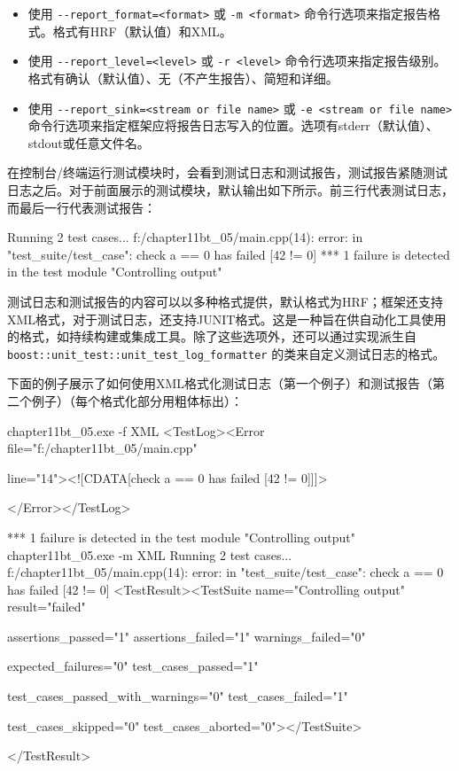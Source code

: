\begin{itemize}
\item
使用 \verb|--report_format=<format>| 或 \verb|-m <format>| 命令行选项来指定报告格式。格式有HRF（默认值）和XML。

\item
使用 \verb|--report_level=<level>| 或 \verb|-r <level>| 命令行选项来指定报告级别。格式有确认（默认值）、无（不产生报告）、简短和详细。

\item
使用 \verb|--report_sink=<stream or file name>| 或 \verb|-e <stream or file name>| 命令行选项来指定框架应将报告日志写入的位置。选项有stderr（默认值）、stdout或任意文件名。
\end{itemize}


在控制台/终端运行测试模块时，会看到测试日志和测试报告，测试报告紧随测试日志之后。对于前面展示的测试模块，默认输出如下所示。前三行代表测试日志，而最后一行代表测试报告：

\begin{shell}
Running 2 test cases...
f:/chapter11bt_05/main.cpp(14): error: in "test_suite/test_case":
check a == 0 has failed [42 != 0]
*** 1 failure is detected in the test module "Controlling output"
\end{shell}

测试日志和测试报告的内容可以以多种格式提供，默认格式为HRF；框架还支持XML格式，对于测试日志，还支持JUNIT格式。这是一种旨在供自动化工具使用的格式，如持续构建或集成工具。除了这些选项外，还可以通过实现派生自 \verb|boost::unit_test::unit_test_log_formatter| 的类来自定义测试日志的格式。

下面的例子展示了如何使用XML格式化测试日志（第一个例子）和测试报告（第二个例子）（每个格式化部分用粗体标出）：

\begin{shell}
chapter11bt_05.exe -f XML
<TestLog><Error file="f:/chapter11bt_05/main.cpp"

line="14"><![CDATA[check a == 0 has failed [42 != 0]]]>

</Error></TestLog>

*** 1 failure is detected in the test module "Controlling output"
chapter11bt_05.exe -m XML
Running 2 test cases...
f:/chapter11bt_05/main.cpp(14): error: in "test_suite/test_case":
check a == 0 has failed [42 != 0]
<TestResult><TestSuite name="Controlling output" result="failed"

assertions_passed="1" assertions_failed="1" warnings_failed="0"

expected_failures="0" test_cases_passed="1"

test_cases_passed_with_warnings="0" test_cases_failed="1"

test_cases_skipped="0" test_cases_aborted="0"></TestSuite>

</TestResult>
\end{shell}

